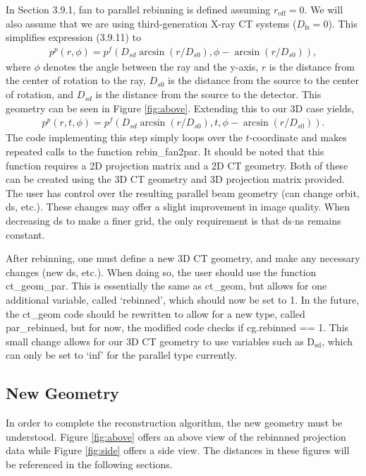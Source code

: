 \documentclass[12pt]{elsarticle}
\begin{document}
In Section 3.9.1, fan to parallel rebinning is defined assuming $r_{\mathrm{off}}=0$. We will also assume that we are using third-generation X-ray CT systems ($D_\mathrm{fs}=0$). This simplifies expression
(3.9.11) to
\begin{eqnarray*}
p^p(r,\phi) = p^f(D_{sd}\arcsin(r/D_{s0}),\phi-\arcsin(r/D_{s0})),
\end{eqnarray*}
where $\phi$ denotes the angle between the ray and the y-axis, $r$ is the distance from the center of rotation to the ray, $D_{s0}$ is the distance from the source to the center of rotation, and $D_{sd}$ is 
the distance from the source to the detector. This geometry can be seen in Figure \ref{fig:above}. Extending this to our 3D case yields, 
\begin{eqnarray*}
p^p(r,t,\phi) = p^f(D_{sd}\arcsin(r/D_{s0}),t,\phi-\arcsin(r/D_{s0})).
\end{eqnarray*}
The code implementing this step simply loops over the $t$-coordinate and makes repeated calls to the function rebin\_fan2par. It should be noted that this function requires a 2D projection matrix and a 2D CT geometry. Both of these can be created using the 3D CT geometry and 3D projection matrix provided. The user has control over the resulting parallel beam geometry (can change orbit, ds, etc.). These changes may offer a slight improvement in image quality. When decreasing ds to make a finer grid, the only requirement is that ds$\cdot$ns remains constant. 

After rebinning, one must define a new 3D CT geometry, and make any necessary changes (new ds, etc.). When doing so, the user should use the function ct\_geom\_par. This is essentially the same as ct\_geom, but allows for one additional variable, called `rebinned', which should now be set to 1. In the future, the ct\_geom code should be rewritten to allow for a new type, called par\_rebinned, but for now, the modified code checks if cg.rebinned == 1. This small change allows for our 3D CT geometry to use variables such as D$_\mathrm{sd}$, which can only be set to `inf' for the parallel type currently.


\subsection{New Geometry}
In order to complete the reconstruction algorithm, the new geometry must be understood. Figure \ref{fig:above} offers an above view of the rebinnned projection data while Figure \ref{fig:side}
offers a side view. The distances in these figures will be referenced in the following sections.
\end{document}
